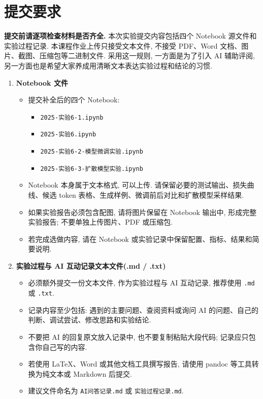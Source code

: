\documentclass{../../nndlcourse}
\begin{document}
\section{提交要求}

\textbf{提交前请逐项检查材料是否齐全.} 本次实验提交内容包括四个 Notebook 源文件和实验过程记录. 本课程作业上传只接受文本文件, 不接受 PDF、Word 文档、图片、截图、压缩包等二进制文件. 采用这一规则, 一方面是为了引入 AI 辅助评阅, 另一方面也是希望大家养成用清晰文本表达实验过程和结论的习惯.

\begin{enumerate}
    \item \textbf{Notebook 文件}
    \begin{itemize}
        \item 提交补全后的四个 Notebook:
        \begin{itemize}
            \item \texttt{2025-实验6-1.ipynb}
            \item \texttt{2025-实验6.ipynb}
            \item \texttt{2025-实验6-2-模型微调实验.ipynb}
            \item \texttt{2025-实验6-3-扩散模型实验.ipynb}
        \end{itemize}
        \item Notebook 本身属于文本格式, 可以上传. 请保留必要的测试输出、损失曲线、候选 token 表格、生成样例、微调前后对比和扩散模型采样结果.
        \item 如果实验报告必须包含配图, 请将图片保留在 Notebook 输出中, 形成完整实验报告; 不要单独上传图片、PDF 或压缩包.
        \item 若完成选做内容, 请在 Notebook 或实验记录中保留配置、指标、结果和简要说明.
    \end{itemize}
    \item \textbf{实验过程与 AI 互动记录文本文件(.md / .txt)}
    \begin{itemize}
        \item 必须额外提交一份文本文件, 作为实验过程与 AI 互动记录, 推荐使用 \texttt{.md} 或 \texttt{.txt}.
        \item 记录内容至少包括: 遇到的主要问题、查阅资料或询问 AI 的问题、自己的判断、调试尝试、修改思路和实验结论.
        \item 不要把 AI 的回复原文放入记录中, 也不要复制粘贴大段代码; 记录应只包含你自己写的内容.
        \item 若使用 \LaTeX{}、Word 或其他文档工具撰写报告, 请使用 pandoc 等工具转换为纯文本或 Markdown 后提交.
        \item 建议文件命名为 \texttt{AI问答记录.md} 或 \texttt{实验过程记录.md}.
    \end{itemize}
\end{enumerate}
\end{document}

